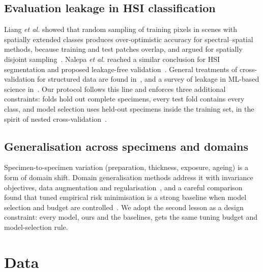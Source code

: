 \documentclass[journal]{IEEEtran}
\begin{document}
\subsection{Evaluation leakage in HSI classification}
Liang \emph{et al.} showed that random sampling of training pixels in scenes with spatially extended classes produces over-optimistic accuracy for spectral--spatial methods, because training and test patches overlap, and argued for spatially disjoint sampling~\cite{liang2017sampling}. Nalepa \emph{et al.} reached a similar conclusion for HSI segmentation and proposed leakage-free validation~\cite{nalepa2019validating}. General treatments of cross-validation for structured data are found in~\cite{roberts2017cv}, and a survey of leakage in ML-based science in~\cite{kapoor2023leakage}. Our protocol follows this line and enforces three additional constraints: folds hold out complete specimens, every test fold contains every class, and model selection uses held-out specimens inside the training set, in the spirit of nested cross-validation~\cite{cawley2010overfitting}.

\subsection{Generalisation across specimens and domains}
Specimen-to-specimen variation (preparation, thickness, exposure, ageing) is a form of domain shift. Domain generalisation methods address it with invariance objectives, data augmentation and regularisation~\cite{zhou2022dgsurvey,wang2022dgsurvey}, and a careful comparison found that tuned empirical risk minimisation is a strong baseline when model selection and budget are controlled~\cite{gulrajani2021domainbed}. We adopt the second lesson as a design constraint: every model, ours and the baselines, gets the same tuning budget and model-selection rule.

\section{Data}
\end{document}
